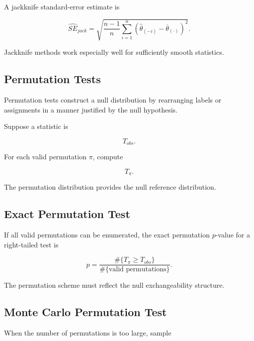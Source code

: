 A jackknife standard-error estimate is

\[
\boxed{
\widehat{SE}_{jack}
=
\sqrt{
\frac{
n-1
}{
n
}
\sum_{i=1}^{n}
\left(
\widehat{\theta}_{(-i)}
-
\overline{\theta}_{(\cdot)}
\right)^2
}.
}
\]

Jackknife methods work especially well for sufficiently smooth
statistics.

\subsection{Permutation Tests}
\label{subsec:permutation-tests-computational}

Permutation tests construct a null distribution by rearranging labels or
assignments in a manner justified by the null hypothesis.

Suppose a statistic is

\[
\boxed{
T_{obs}.
}
\]

For each valid permutation \(\pi\), compute

\[
\boxed{
T_\pi.
}
\]

The permutation distribution provides the null reference distribution.

\subsection{Exact Permutation Test}
\label{subsec:exact-permutation-test}

If all valid permutations can be enumerated, the exact permutation
\(p\)-value for a right-tailed test is

\[
\boxed{
p
=
\frac{
\#\{
T_\pi\geq T_{obs}
\}
}{
\#\{
\text{valid permutations}
\}
}.
}
\]

The permutation scheme must reflect the null exchangeability structure.

\subsection{Monte Carlo Permutation Test}
\label{subsec:monte-carlo-permutation-test}

When the number of permutations is too large, sample

